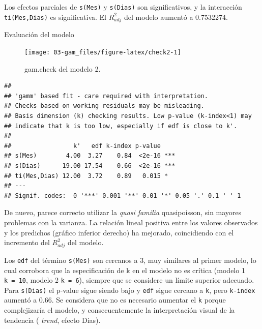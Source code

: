 \documentclass[
]{book}
\newenvironment{Shaded}{\begin{snugshade}}{\end{snugshade}}
\newcommand{\AttributeTok}[1]{\textcolor[rgb]{0.77,0.63,0.00}{#1}}
\newcommand{\DecValTok}[1]{\textcolor[rgb]{0.00,0.00,0.81}{#1}}
\newcommand{\FunctionTok}[1]{\textcolor[rgb]{0.00,0.00,0.00}{#1}}
\newcommand{\NormalTok}[1]{#1}
\newcommand{\SpecialCharTok}[1]{\textcolor[rgb]{0.00,0.00,0.00}{#1}}
\newcommand{\StringTok}[1]{\textcolor[rgb]{0.31,0.60,0.02}{#1}}
\begin{document}
Los efectos parciales de \texttt{s(Mes)} y \texttt{s(Dias)} son significativos, y la interacción \texttt{ti(Mes,Dias)} es significativa. El \(R_{adj}^{2}\) del modelo aumentó a 0.7532274.

Evaluación del modelo

\begin{Shaded}
\end{Shaded}

\begin{figure}

{\centering \texttt{[image: 03-gam\_files/figure-latex/check2-1]} 

}

\caption{gam.check del modelo 2.}\label{fig:check2}
\end{figure}

\begin{verbatim}
## 
## 'gamm' based fit - care required with interpretation.
## Checks based on working residuals may be misleading.
## Basis dimension (k) checking results. Low p-value (k-index<1) may
## indicate that k is too low, especially if edf is close to k'.
## 
##                 k'   edf k-index p-value    
## s(Mes)        4.00  3.27    0.84  <2e-16 ***
## s(Dias)      19.00 17.54    0.66  <2e-16 ***
## ti(Mes,Dias) 12.00  3.72    0.89   0.015 *  
## ---
## Signif. codes:  0 '***' 0.001 '**' 0.01 '*' 0.05 '.' 0.1 ' ' 1
\end{verbatim}

De nuevo, parece correcto utilizar la \emph{quasi familia} quasipoisson, sin mayores problemas con la varianza. La relación lineal positiva entre los valores observados y los predichos (gráfico inferior derecho) ha mejorado, coincidiendo con el incremento del \(R_{adj}^{2}\) del modelo.

Los \texttt{edf} del término \texttt{s(Mes)} son cercanos a 3, muy similares al primer modelo, lo cual corrobora que la especificación de k en el modelo no es crítica (modelo 1 \texttt{k\ =\ 10}, modelo 2 \texttt{k\ =\ 6}), siempre que se considere un límite superior adecuado. Para \texttt{s(Dias)} el p-value sigue siendo bajo y \texttt{edf} sigue cercano a \texttt{k\textquotesingle{}}, pero \texttt{k-index} aumentó a 0.66. Se considera que no es necesario aumentar el \texttt{k} porque complejizaría el modelo, y consecuentemente la interpretación visual de la tendencia ( \emph{trend}, efecto Dias).
\end{document}

